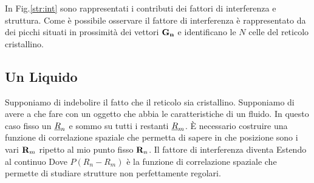 In Fig.\ref{str:int} sono rappresentati i contributi dei fattori di interferenza e struttura. Come è possibile osservare il fattore di interferenza è rappresentato da dei picchi situati in prossimità dei vettori $ {\it\bf G_n}$ e identificano le $N$ celle del reticolo cristallino.
\subsection{Un Liquido}
Supponiamo di indebolire il fatto che il reticolo sia cristallino. Supponiamo di avere a che fare con un oggetto che abbia le caratteristiche di un fluido. In questo caso fisso un $\xv{R} _n$ e sommo su tutti i restanti $\xv{R} _m$. \`E necessario costruire una funzione di correlazione spaziale che permetta di sapere in che posizione sono i vari ${\it\bf R} _m$ ripetto al mio punto fisso ${\it\bf R} _n$. Il fattore di interferenza diventa 
Estendo al continuo
Dove $P(R_n-R_m)$ è la funzione di correlazione spaziale che permette di studiare strutture non perfettamente regolari.


